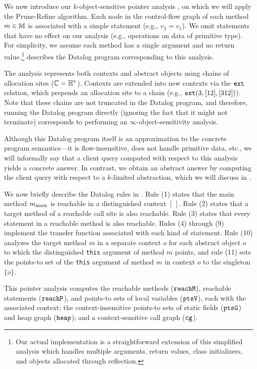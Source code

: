 We now introduce our $k$-object-sensitive pointer analysis \cite{kobj},
on which we will apply the Prune-Refine algorithm.
Each node in the control-flow graph of each method $m \in {\mathbb M}$ is associated with a
simple statement (e.g., $v_2 = v_1$).
We omit statements that have no effect on our analysis (e.g., operations on
data of primitive type).
For simplicity, we assume each method has a single argument and no return value.\footnote{
Our actual implementation is a straightforward extension of this simplified analysis
which handles multiple arguments, return values, class initializers, and
objects allocated through reflection.}
 describes the Datalog program corresponding to this
analysis.

The analysis represents both contexts and abstract objects using chains of
allocation sites (${\mathbb C} = {\mathbb H}^*$).  Contexts are extended into new contexts via the $\text{\tt ext}$ relation,
which prepends an allocation site to a chain (e.g., $\text{\tt ext}(3,[12],[312])$).
Note that these chains are not truncated in the Datalog program, and therefore,
running the Datalog program directly (ignoring the fact that it might not
terminate) corresponds to performing an $\infty$-object-sensitivity analysis.

Although this Datalog program itself is an approximation to the concrete
program semantics---it is flow-insensitive, does not handle primitive data,
etc., we will informally say that a client query computed with respect to this
analysis yields a concrete answer.  In contrast, we obtain an abstract
answer by computing the client query with respect to a $k$-limited abstraction,
which we will discuss in .

We now briefly describe the Datalog rules in .  Rule (1)
states that the main method $m_\text{main}$ is reachable in a distinguished context $[\,]$.
Rule (2) states that a target method of a reachable call site is also reachable.
Rule (3) states that every statement in a reachable method is also reachable.
Rules (4) through (9) implement the transfer function associated with each kind of statement.
Rule (10) analyzes the target method
$m$ in a separate context $o$ for each abstract object $o$ to which the distinguished
{\tt this} argument of method $m$ points, and rule (11) sets the points-to set
of the {\tt this} argument of method $m$ in context $o$ to the singleton $\{ o \}$.

This pointer analysis computes the reachable methods ($\text{\tt reachM}$), reachable statements ($\text{\tt reachP}$), and
points-to sets of local variables ($\text{\tt ptsV}$), each with the associated context;
the context-insensitive points-to sets of static fields ($\text{\tt ptsG}$) and
heap graph ($\text{\tt heap}$); and a context-sensitive call graph ($\text{\tt cg}$).

